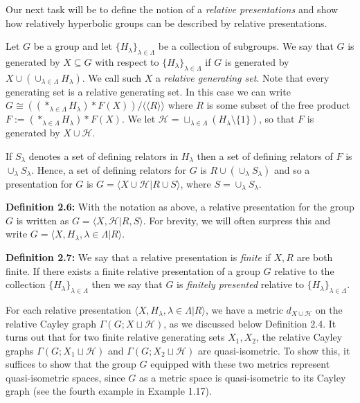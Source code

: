 \documentclass[12pt]{article}
\newcommand{\vs}{\vskip10pt}
\begin{document}
	Our next task will be to define the notion of a \textit{relative presentations} and show how relatively hyperbolic groups can be described by relative presentations.
	
	\vs
	
	Let $G$ be a group and let $\{H_{\lambda}\}_{\lambda \in \Lambda}$ be a collection of subgroups. We say that $G$ is generated by $X \subseteq G$ with respect to $\{H_{\lambda}\}_{\lambda \in \Lambda}$ if $G$ is generated by $X \cup (\cup_{\lambda \in \Lambda} H_{\lambda})$. We call such $X$ a \textit{relative generating set}. Note that every generating set is a relative generating set. In this case we can write $G \cong ((*_{\lambda \in \Lambda} H_{\lambda}) * F(X))/\langle \langle R \rangle \rangle$ where $R$ is some subset of the free product $F := (*_{\lambda \in \Lambda} H_{\lambda}) * F(X)$. We let $\mathcal{H} = \sqcup_{\lambda \in \Lambda} (H_{\lambda} \setminus \{1\})$, so that $F$ is generated by $X \cup \mathcal{H}$.
	
	\vs 
	
	If $S_{\lambda}$ denotes a set of defining relators in $H_{\lambda}$ then a set of defining relators of $F$ is $\cup_{\lambda} S_{\lambda}$. Hence, a set of defining relators for $G$ is $R \cup (\cup_{\lambda} S_{\lambda})$ and so a presentation for $G$ is $G = \langle X \cup \mathcal{H} \vert R \cup S \rangle$, where $S = \cup_{\lambda} S_{\lambda}$. 
	
	\vs 
	
	\textbf{Definition 2.6: } With the notation as above, a relative presentation for the group $G$ is written as $G = \langle X, \mathcal{H} \vert R, S \rangle$. For brevity, we will often surpress this and write $G = \langle X, H_{\lambda}, \lambda \in \Lambda \vert R \rangle$. 
	
	\vs 
	
	\textbf{Definition 2.7: } We say that a relative presentation is \textit{finite} if $X,R$ are both finite. If there exists a finite relative presentation of a group $G$ relative to the collection $\{H_{\lambda}\}_{\lambda \in \Lambda}$ then we say that $G$ is \textit{finitely presented} relative to $\{H_{\lambda}\}_{\lambda \in \Lambda}$. 
	
	\vs 
	
	For each relative presentation $\langle X, H_{\lambda}, \lambda \in \Lambda \vert R \rangle$, we have a metric $d_{X \cup \mathcal{H}}$ on the relative Cayley graph $\Gamma(G; X \sqcup \mathcal{H})$, as we discussed below Definition 2.4. It turns out that for two finite relative generating sets $X_1, X_2$, the relative Cayley graphs $\Gamma(G; X_1 \sqcup \mathcal{H})$ and $\Gamma(G; X_2 \sqcup \mathcal{H})$ are quasi-isometric. To show this, it suffices to show that the group $G$ equipped with these two metrics represent quasi-isometric spaces, since $G$ as a metric space is quasi-isometric to its Cayley graph (see the fourth example in Example 1.17). 
	
\end{document}
